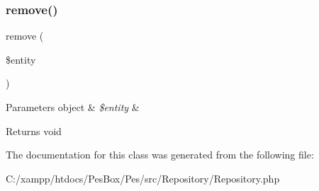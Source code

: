 \subsubsection{\texorpdfstring{remove()}{remove()}}
{\footnotesize\ttfamily remove (\begin{DoxyParamCaption}\item[{}]{\$entity }\end{DoxyParamCaption})}


\begin{DoxyParams}[1]{Parameters}
object & {\em \$entity} & \\
\hline
\end{DoxyParams}
\begin{DoxyReturn}{Returns}
void 
\end{DoxyReturn}


The documentation for this class was generated from the following file\+:\begin{DoxyCompactItemize}
\item 
C\+:/xampp/htdocs/\+Pes\+Box/\+Pes/src/\+Repository/Repository.\+php\end{DoxyCompactItemize}
